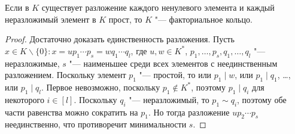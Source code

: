 \begin{proposition}
	Если в $K$ существует разложение каждого ненулевого элемента и каждый неразложимый элемент в $K$ прост, то $K$ "--- факториальное кольцо.
\end{proposition}

\begin{proof}
	Достаточно доказать единственность разложения. Пусть $x \in K\backslash\{0\}: x = up_1\dotsm p_s = wq_1\dotsm q_l$, где $u, w \in K^*$, $p_1, \dotsc, p_s, q_1, \dotsc, q_l$ "--- неразложимые, $s$ "--- наименьшее среди всех элементов с неединственным разложением. Поскольку элемент $p_1$ "--- простой, то или $p_1\mid w$, или $p_1 \mid q_1$, \dots, или $p_1 \mid q_l$. Первое невозможно, поскольку $p_1 \not\in K^*$, поэтому $p_1 \mid q_i$ для некоторого $i \in [l]$. Поскольку $q_i$ "--- неразложимый, то $p_1 \sim q_i$, поэтому обе части равенства можно сократить на $p_1$. Но тогда разложение $up_2\dotsm p_s$ неединственно, что противоречит минимальности $s$.
\end{proof}